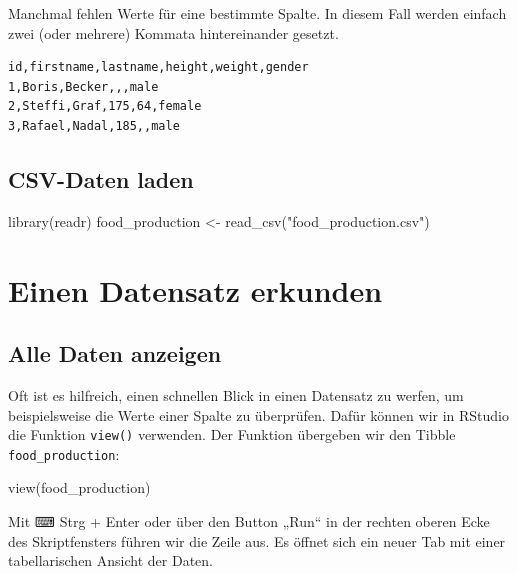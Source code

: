\documentclass[
]{book}
\newenvironment{Shaded}{\begin{snugshade}}{\end{snugshade}}
\newcommand{\FunctionTok}[1]{\textcolor[rgb]{0.00,0.00,0.00}{#1}}
\newcommand{\NormalTok}[1]{#1}
\newcommand{\OtherTok}[1]{\textcolor[rgb]{0.56,0.35,0.01}{#1}}
\newcommand{\StringTok}[1]{\textcolor[rgb]{0.31,0.60,0.02}{#1}}
\begin{document}
Manchmal fehlen Werte für eine bestimmte Spalte. In diesem Fall werden einfach zwei (oder mehrere) Kommata hintereinander gesetzt.

\begin{verbatim}
id,firstname,lastname,height,weight,gender
1,Boris,Becker,,,male
2,Steffi,Graf,175,64,female
3,Rafael,Nadal,185,,male
\end{verbatim}

\hypertarget{csv-daten-laden}{%
\section{CSV-Daten laden}\label{csv-daten-laden}}

\begin{Shaded}
\begin{Highlighting}[]
\FunctionTok{library}\NormalTok{(readr)}
\NormalTok{food\_production }\OtherTok{\textless{}{-}} \FunctionTok{read\_csv}\NormalTok{(}\StringTok{"food\_production.csv"}\NormalTok{)}
\end{Highlighting}
\end{Shaded}

\hypertarget{einen-datensatz-erkunden}{%
\chapter{Einen Datensatz erkunden}\label{einen-datensatz-erkunden}}

\hypertarget{alle-daten-anzeigen}{%
\section{Alle Daten anzeigen}\label{alle-daten-anzeigen}}

Oft ist es hilfreich, einen schnellen Blick in einen Datensatz zu werfen, um beispielsweise die Werte einer Spalte zu überprüfen. Dafür können wir in RStudio die Funktion \texttt{view()} verwenden. Der Funktion übergeben wir den Tibble \texttt{food\_production}:

\begin{Shaded}
\begin{Highlighting}[]
\FunctionTok{view}\NormalTok{(food\_production)}
\end{Highlighting}
\end{Shaded}

Mit ⌨ Strg + Enter oder über den Button „Run`` in der rechten oberen Ecke des Skriptfensters führen wir die Zeile aus. Es öffnet sich ein neuer Tab mit einer tabellarischen Ansicht der Daten.
\end{document}
